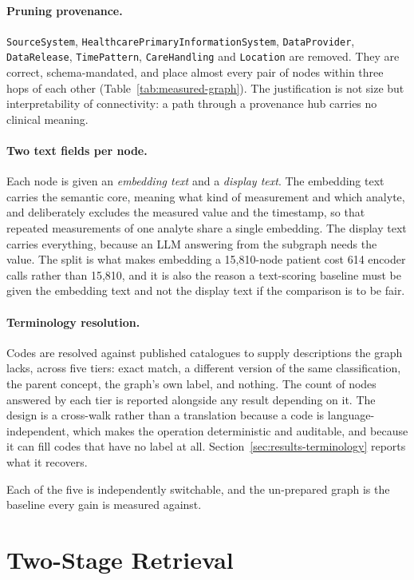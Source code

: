 \paragraph{Pruning provenance.} \texttt{SourceSystem},
\texttt{HealthcarePrimaryInformationSystem}, \texttt{DataProvider},
\texttt{DataRelease}, \texttt{TimePattern}, \texttt{CareHandling} and
\texttt{Location} are removed. They are correct, schema-mandated, and place
almost every pair of nodes within three hops of each other
(Table~\ref{tab:measured-graph}). The justification is not size but
interpretability of connectivity: a path through a provenance hub carries no
clinical meaning.

\paragraph{Two text fields per node.} Each node is given an \emph{embedding text}
and a \emph{display text}. The embedding text carries the semantic core, meaning
what kind of measurement and which analyte, and deliberately excludes the measured
value and the timestamp, so that repeated measurements of one analyte share a
single embedding. The display text carries everything, because an LLM answering
from the subgraph needs the value. The split is what makes embedding a
15{,}810-node patient cost 614 encoder calls rather than 15{,}810, and it is also
the reason a text-scoring baseline must be given the embedding text and not the
display text if the comparison is to be fair.

\paragraph{Terminology resolution.} Codes are resolved against published
catalogues to supply descriptions the graph lacks, across five tiers: exact
match, a different version of the same classification, the parent concept, the
graph's own label, and nothing. The count of nodes answered by each tier is
reported alongside any result depending on it. The design is a cross-walk rather than a
translation because a code is language-independent, which makes the operation
deterministic and auditable, and because it can fill codes that have no label at
all. Section~\ref{sec:results-terminology} reports what it recovers.

Each of the five is independently switchable, and the un-prepared graph is the
baseline every gain is measured against.

\section{Two-Stage Retrieval} \label{sec:methodology-candidates}


